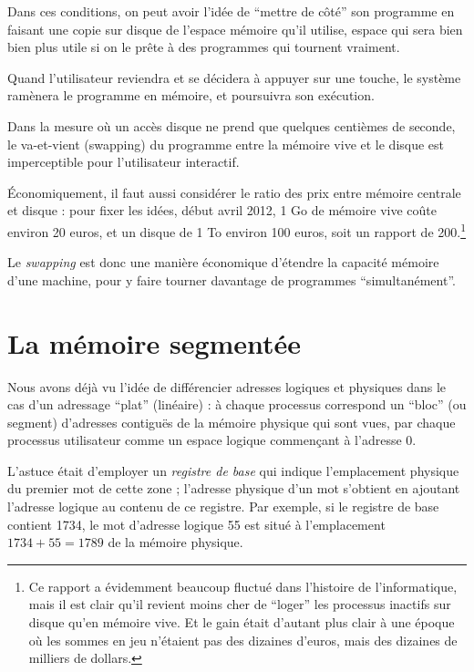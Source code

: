 \begin{multicols}{2}
Dans ces conditions, on peut avoir l'idée de ``mettre de côté'' son
programme en faisant une copie sur disque de l'espace mémoire qu'il
utilise, espace qui sera bien bien plus utile si on le prête à des
programmes qui tournent vraiment.


Quand l'utilisateur reviendra et se décidera à appuyer sur une touche, 
le 
système ramènera le programme en mémoire, et poursuivra son exécution.

Dans la mesure où un accès disque ne prend que quelques centièmes de
seconde, le va-et-vient (swapping) du programme entre la mémoire vive
et le disque est imperceptible pour l'utilisateur interactif.

Économiquement, il faut aussi considérer le ratio des prix
entre mémoire centrale et disque : pour fixer les idées, début avril
2012, 1 Go de mémoire vive coûte environ 20 euros, et un disque de 1
To environ 100 euros, soit un rapport de 200.\footnote{
Ce rapport a évidemment beaucoup fluctué dans l'histoire de
l'informatique, mais il est clair qu'il revient moins cher de
``loger'' les processus inactifs sur disque qu'en mémoire vive. Et le
gain était d'autant plus clair à une époque où les sommes en jeu
n'étaient pas des dizaines d'euros, mais des dizaines de milliers de
dollars.}  

Le \emph{swapping} est donc une manière économique d'étendre la
capacité mémoire d'une machine, pour y faire tourner davantage de
programmes ``simultanément''.



\section{La mémoire segmentée}

Nous avons déjà vu l'idée de différencier adresses logiques et
physiques dans le cas d'un adressage ``plat'' (linéaire) : à chaque
processus correspond un ``bloc'' (ou segment) d'adresses contiguës de
la mémoire physique qui sont vues, par chaque processus utilisateur
comme un espace logique commençant à l'adresse 0.

L'astuce était d'employer un \emph{registre de base} qui indique
l'emplacement physique du premier mot de cette zone ; l'adresse
physique d'un mot s'obtient en ajoutant l'adresse logique au contenu
de ce registre.  Par exemple, si le registre de base contient 1734, le
mot d'adresse logique 55 est situé à l'emplacement $1734+55=1789$ de
la mémoire physique.


\end{multicols}
